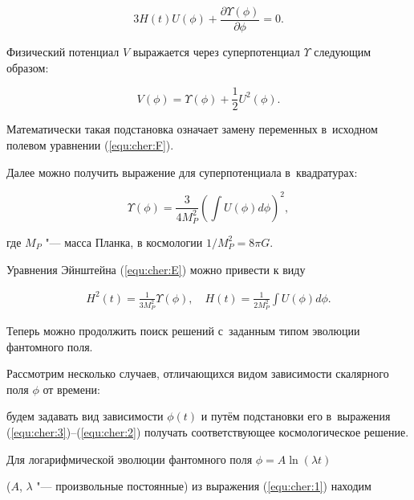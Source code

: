 \begin{equation*}

 3H(t)U(\phi)+\frac{\partial \Upsilon(\phi)}{\partial \phi} =0.

\end{equation*}

Физический потенциал $V$ выражается через суперпотенциал $\Upsilon$ следующим образом:

\begin{equation} \label{equ:cher:3}

V(\phi) = \Upsilon (\phi)+\frac12 U^2(\phi).

\end{equation}

Математически такая подстановка означает замену переменных в~исходном полевом уравнении (\ref{equ:cher:F}).

Далее можно получить выражение для суперпотенциала в~квадратурах:

\begin{equation} \label{equ:cher:1}

\Upsilon (\phi)=\frac{3}{4M_P^2}\left(\int U(\phi)d\phi\right)^2,

\end{equation}

где $ M_P $ "--- масса Планка, в космологии $1/M_P^2 = 8 \pi G $.

Уравнения Эйнштейна (\ref{equ:cher:E}) можно привести к виду

\begin{eqnarray} \label{equ:cher:2}

H^2(t)=\frac{1}{3M_P^2}\Upsilon (\phi), \quad

H(t)=\frac{1}{2M_P^2}\int U(\phi)d\phi.

\end{eqnarray}



Теперь можно продолжить поиск решений с~заданным типом эволюции фантомного поля.

Рассмотрим несколько случаев, отличающихся видом зависимости скалярного поля $ \phi $ от времени:

будем задавать вид зависимости $ \phi(t) $ и путём подстановки его в~выражения (\ref{equ:cher:3})--(\ref{equ:cher:2}) получать соответствующее космологическое решение.



Для логарифмической эволюции фантомного поля $ \phi = A \ln (\lambda t) $

($A$, $\lambda$ "--- произвольные постоянные) из выражения (\ref{equ:cher:1}) находим 

